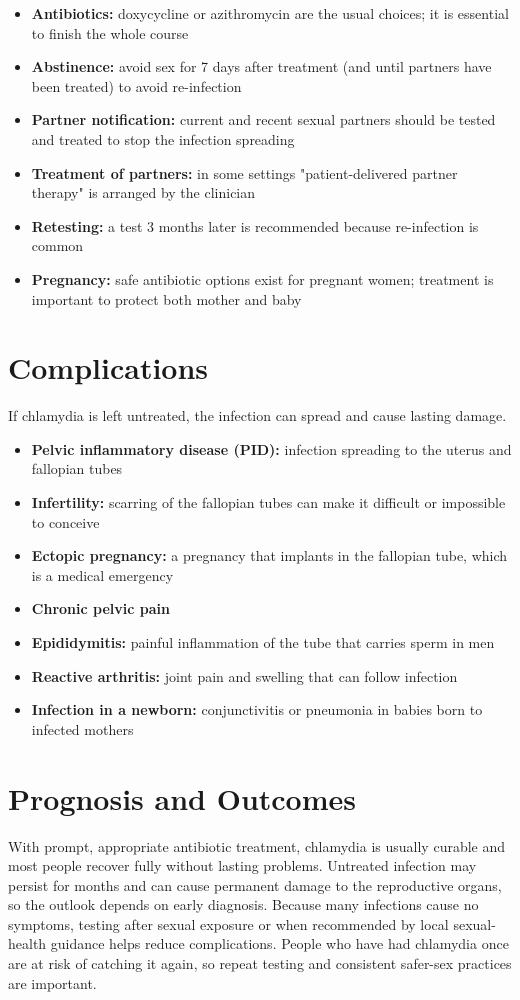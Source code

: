 \begin{itemize}
    \item \textbf{Antibiotics:} doxycycline or azithromycin are the usual choices; it is essential to finish the whole course
    \item \textbf{Abstinence:} avoid sex for 7 days after treatment (and until partners have been treated) to avoid re-infection
    \item \textbf{Partner notification:} current and recent sexual partners should be tested and treated to stop the infection spreading
    \item \textbf{Treatment of partners:} in some settings "patient-delivered partner therapy" is arranged by the clinician
    \item \textbf{Retesting:} a test 3 months later is recommended because re-infection is common
    \item \textbf{Pregnancy:} safe antibiotic options exist for pregnant women; treatment is important to protect both mother and baby
\end{itemize}

\section*{Complications}
If chlamydia is left untreated, the infection can spread and cause lasting damage.

\begin{itemize}
    \item \textbf{Pelvic inflammatory disease (PID):} infection spreading to the uterus and fallopian tubes
    \item \textbf{Infertility:} scarring of the fallopian tubes can make it difficult or impossible to conceive
    \item \textbf{Ectopic pregnancy:} a pregnancy that implants in the fallopian tube, which is a medical emergency
    \item \textbf{Chronic pelvic pain}
    \item \textbf{Epididymitis:} painful inflammation of the tube that carries sperm in men
    \item \textbf{Reactive arthritis:} joint pain and swelling that can follow infection
    \item \textbf{Infection in a newborn:} conjunctivitis or pneumonia in babies born to infected mothers
\end{itemize}

\section*{Prognosis and Outcomes}
With prompt, appropriate antibiotic treatment, chlamydia is usually curable and most people recover fully without lasting problems. Untreated infection may persist for months and can cause permanent damage to the reproductive organs, so the outlook depends on early diagnosis. Because many infections cause no symptoms, testing after sexual exposure or when recommended by local sexual-health guidance helps reduce complications. People who have had chlamydia once are at risk of catching it again, so repeat testing and consistent safer-sex practices are important.

